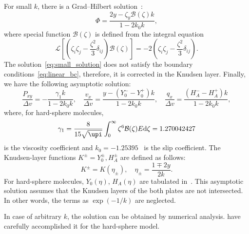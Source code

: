 \documentclass[final]{jfm} %
\newcommand{\dd}{\mathrm{d}}
\begin{document}
For small \(k\), there is a Grad--Hilbert solution~\citep[see e.g.][]{Ohwada1990, Sone2007}:
\begin{equation}\label{eq:small_solution}
    \Phi = \frac{2y - \zeta_y \mathcal{B}(\zeta) k}{1-2k_0k},
\end{equation}
where special function \(\mathcal{B}(\zeta)\) is defined from the integral equation
\begin{equation}\label{eq:transport_B}
    \mathcal{L}\left[\left(\zeta_i\zeta_j-\frac{\zeta^2}3\delta_{ij}\right) \mathcal{B}(\zeta)\right]
        = -2\left(\zeta_i\zeta_j-\frac{\zeta^2}3\delta_{ij}\right).
\end{equation}
The solution~\eqref{eq:small_solution} does not satisfy the boundary conditions~\eqref{eq:linear_bc},
therefore, it is corrected in the Knudsen layer. Finally, we have the following asymptotic solution:
\begin{equation}\label{eq:small_macro}
    \frac{P_{xy}}{\Delta{v}} = - \frac{\gamma_1 k}{1-2k_0k}, \quad
    \frac{v_x}{\Delta{v}} = \frac{y - (Y_0^--Y_0^+)k}{1-2k_0k}, \quad
    \frac{q_x}{\Delta{v}} = \frac{(H_A^--H_A^+)k}{1-2k_0k},
\end{equation}
where, for hard-sphere molecules,
\begin{equation}\label{eq:gamma_1}
    \gamma_1 = \frac{8}{15\sqrt{\upi}}\int_0^\infty \zeta^6 \mathcal{B}(\zeta)E\dd\zeta = 1.270042427
\end{equation}
is the viscosity coefficient and \(k_0 = -1.25395\)~\citep{Takata2015} is the slip coefficient.
The Knudsen-layer functions \(K^\pm = Y_0^\pm, H_A^\pm\) are defined as follows:
\begin{equation}\label{eq:linear_knudsen_functions}
     K^\pm = K(\eta_\pm), \quad \eta_\pm = \frac{1 \mp 2y}{2k}.
\end{equation}
For hard-sphere molecules, \(Y_0(\eta)\), \(H_A(\eta)\)
are tabulated in~\citet{Ohwada1989a, Sone2002, Sone2007, Takata2015}.
This asymptotic solution assumes that the Knudsen layers of the both plates are not intersected.
In other words, the terms as \(\exp(-1/k)\) are neglected.

In case of arbitrary \(k\), the solution can be obtained by numerical analysis.
\citet{Ohwada1990} have carefully accomplished it for the hard-sphere model.
\end{document}
